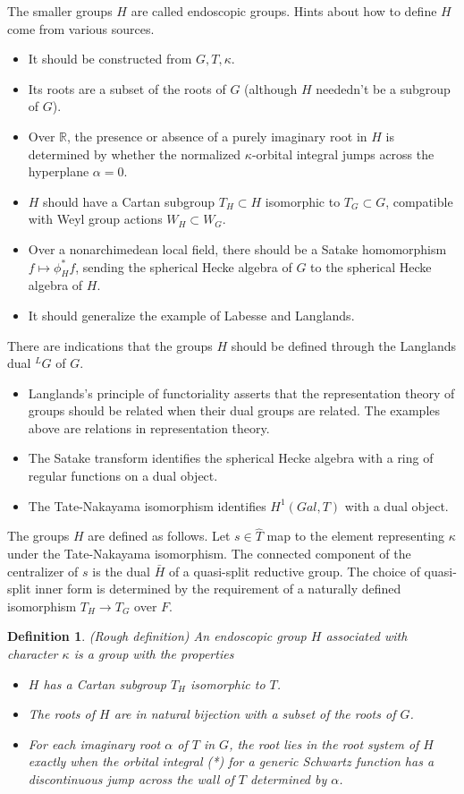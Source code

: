 \documentclass[brochure,english,12pt]{bourbaki}
\newtheorem{definition}[equation]{Definition}
\newcommand{\ring}[1]{\mathbb{#1}}
\begin{document}
The
smaller groups $H$ are called endoscopic groups.
Hints about how to define $H$ come from various sources.
\begin{itemize}
\item It should be constructed from $G,T,\kappa$.
\item Its roots are a subset of the roots of $G$ (although $H$ neededn't
be a subgroup of $G$).
\item Over $\ring{R}$, the presence or absence of a purely imaginary
root in $H$ is determined by whether the normalized $\kappa$-orbital
integral jumps across the hyperplane $\alpha=0$.
\item $H$ should have a Cartan subgroup $T_H\subset H$ isomorphic to
$T_G\subset G$, compatible with Weyl group actions $W_H\subset W_G$.
\item Over a nonarchimedean local field, there should be a Satake
homomorphism $f \mapsto \phi^*_Hf$, sending the spherical Hecke algebra
of $G$ to the spherical Hecke algebra of $H$.
\item It should generalize the example of Labesse and Langlands.
\end{itemize}

There are indications that the groups $H$ should be defined through  
the Langlands dual ${}^LG$ of $G$.
\begin{itemize}
\item Langlands's principle of functoriality asserts that the
  representation theory of groups should be related when their dual
  groups are related.  The examples above are relations in
  representation theory.
\item The Satake transform identifies the spherical Hecke algebra with
  a ring of regular functions on a dual object.
\item The Tate-Nakayama isomorphism identifies $H^1(Gal,T)$
with a dual object.
\end{itemize}

The groups $H$ are defined as follows.  Let $s\in \hat T$ map
to the element representing $\kappa$ under the Tate-Nakayama isomorphism.
The connected component of the centralizer of $s$ is the dual $\bar H$
of a quasi-split reductive group.  The choice of
quasi-split inner form is determined by the requirement of a naturally
defined isomorphism $T_H\to T_G$ over $F$.



\begin{definition}
(Rough definition)
An endoscopic group $H$ associated with character $\kappa$ is a group
with the properties
\begin{itemize}
\item $H$ has a Cartan subgroup $T_H$ isomorphic to $T$.
\item The roots of $H$ are in natural bijection with a subset of the roots of $G$.
\item For each imaginary root $\alpha$ of $T$ in $G$, the root
lies in the root system of $H$ exactly when the orbital integral (*)
for a generic Schwartz function has a discontinuous jump across 
the wall of $T$ determined by $\alpha$.
\end{itemize}
\end{definition}
\end{document}
